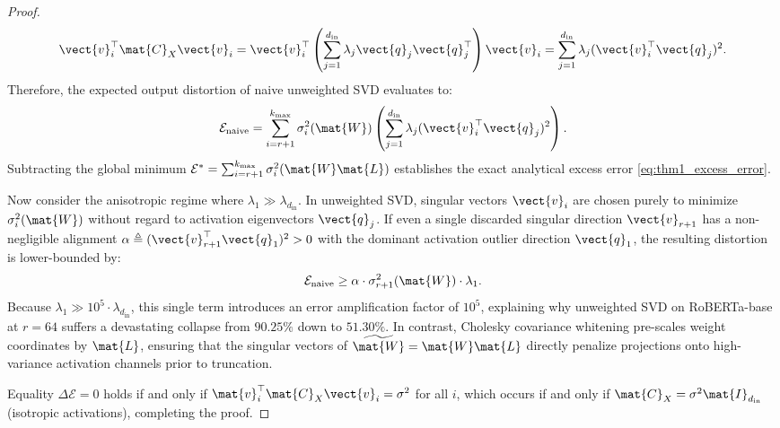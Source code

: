 \begin{proof}
\begin{equation}
\vect{v}_i^\top \mat{C}_X \vect{v}_i = \vect{v}_i^\top \left( \sum_{j=1}^{d_{\text{in}}} \lambda_j \vect{q}_j \vect{q}_j^\top \right) \vect{v}_i = \sum_{j=1}^{d_{\text{in}}} \lambda_j (\vect{v}_i^\top \vect{q}_j)^2.
\end{equation}
Therefore, the expected output distortion of naive unweighted SVD evaluates to:
\begin{equation}
\mathcal{E}_{\text{naive}} = \sum_{i=r+1}^{k_{\max}} \sigma_i^2(\mat{W}) \left( \sum_{j=1}^{d_{\text{in}}} \lambda_j (\vect{v}_i^\top \vect{q}_j)^2 \right).
\label{eq:naive_output_distortion_closed}
\end{equation}
Subtracting the global minimum $\mathcal{E}^* = \sum_{i=r+1}^{k_{\max}} \sigma_i^2(\mat{W}\mat{L})$ establishes the exact analytical excess error \eqref{eq:thm1_excess_error}.

Now consider the anisotropic regime where $\lambda_1 \gg \lambda_{d_{\text{in}}}$. In unweighted SVD, singular vectors $\vect{v}_i$ are chosen purely to minimize $\sigma_i^2(\mat{W})$ without regard to activation eigenvectors $\vect{q}_j$. If even a single discarded singular direction $\vect{v}_{r+1}$ has a non-negligible alignment $\alpha \triangleq (\vect{v}_{r+1}^\top \vect{q}_1)^2 > 0$ with the dominant activation outlier direction $\vect{q}_1$, the resulting distortion is lower-bounded by:
\begin{equation}
\mathcal{E}_{\text{naive}} \ge \alpha \cdot \sigma_{r+1}^2(\mat{W}) \cdot \lambda_1.
\end{equation}
Because $\lambda_1 \gg 10^5 \cdot \lambda_{d_{\text{in}}}$, this single term introduces an error amplification factor of $10^5$, explaining why unweighted SVD on RoBERTa-base at $r=64$ suffers a devastating collapse from $90.25\%$ down to $51.30\%$. 
In contrast, Cholesky covariance whitening pre-scales weight coordinates by $\mat{L}$, ensuring that the singular vectors of $\widetilde{\mat{W}} = \mat{W}\mat{L}$ directly penalize projections onto high-variance activation channels prior to truncation.

Equality $\Delta \mathcal{E} = 0$ holds if and only if $\mat{v}_i^\top \mat{C}_X \vect{v}_i = \sigma^2$ for all $i$, which occurs if and only if $\mat{C}_X = \sigma^2 \mat{I}_{d_{\text{in}}}$ (isotropic activations), completing the proof.
\end{proof}

